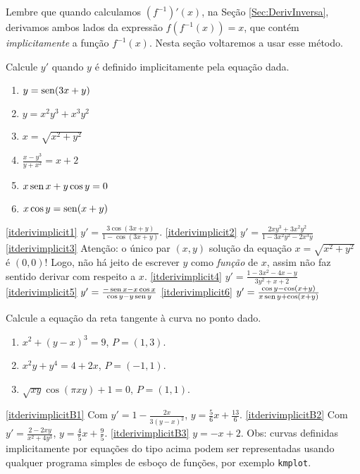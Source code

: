 Lembre que quando 
calculamos $(f^{-1})'(x)$, na Seção \ref{Sec:DerivInversa}, derivamos ambos
lados da expressão $f(f^{-1}(x))=x$, que contém \emph{implicitamente} a função
$f^{-1}(x)$. Nesta seção voltaremos a usar esse método.
\begin{exo}
Calcule $y'$ quando $y$ é definido implicitamente pela equação dada.
\begin{multicols}{2}
\begin{enumerate}
\item\label{itderivimplicit1} $y=\operatorname{sen} (3x+y)$
\item\label{itderivimplicit2} $y=x^2y^3+x^3y^2$
\item\label{itderivimplicit3} $x=\sqrt{x^2+y^2}$
\item\label{itderivimplicit4} $\frac{x-y^3}{y+x^2}=x+2$
\item\label{itderivimplicit5} $x\operatorname{sen} x+y\cos y=0$
\item\label{itderivimplicit6} $x\cos y=\operatorname{sen} (x+y)$
\end{enumerate}
\end{multicols}
\vspace{0.01cm}
\begin{sol}
\eqref{itderivimplicit1} $y'=\frac{3\cos(3x+y)}{1-\cos(3x+y)}$.
\eqref{itderivimplicit2} $y'=\frac{2xy^3+3x^2y^2}{1-3x^2y^2-2x^3y}$
\eqref{itderivimplicit3} Atenção: o único par $(x,y)$ solução da 
equação $x=\sqrt{x^2+y^2}$ é $(0,0)$! Logo, não há jeito de escrever $y$ como 
\emph{função} de $x$, assim não faz sentido derivar com respeito a $x$. 
\eqref{itderivimplicit4} $y'=\frac{1-3x^2-4x-y}{3y^2+x+2}$
\eqref{itderivimplicit5} $y'=\frac{-\operatorname{sen} x-x\cos x}{\cos y-y\operatorname{sen} y}$
\eqref{itderivimplicit6} $y'=\frac{\cos y-\cos(x+y)}{x\operatorname{sen} y+\cos(x+y)}$ 
\end{sol}
\end{exo}

\begin{exo}
Calcule a equação da reta tangente à curva no ponto dado.
\begin{multicols}{1}
\begin{enumerate}
\item\label{itderivimplicitB1} $x^2+(y-x)^3=9$, $P=(1,3)$.
\item\label{itderivimplicitB2} $x^2y+y^4=4+2x$, $P=(-1,1)$.
\item\label{itderivimplicitB3} $\sqrt{xy}\cos (\pi xy)+1=0$, $P=(1,1)$.
\end{enumerate}
\end{multicols}
\vspace{0.01cm}
\begin{sol}
\eqref{itderivimplicitB1} Com $y'=1-\frac{2x}{3(y-x)^2}$,  $y=\frac56
x+\frac{13}{6}$.
\eqref{itderivimplicitB2} Com $y'=\frac{2-2xy}{x^2+4y^3}$, $y=\frac45
x+\frac95$.
\eqref{itderivimplicitB3} $y=-x+2$.
Obs: curvas definidas implicitamente por equações do tipo acima podem ser
representadas usando qualquer programa simples de esboço de funções, por exemplo
\verb|kmplot|.
\end{sol}
\end{exo}


